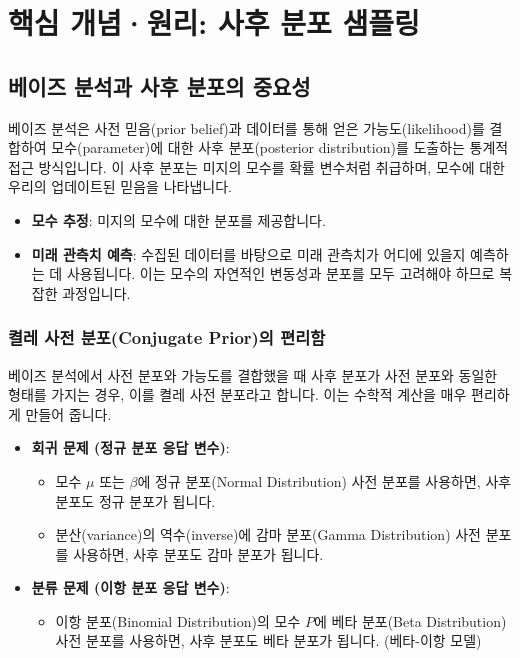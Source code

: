\documentclass[11pt,a4paper]{book}
\providecommand{\newsection}{\section}
\theoremstyle{definition}
\begin{document}
\newsection{핵심 개념·원리: 사후 분포 샘플링}

\subsection*{베이즈 분석과 사후 분포의 중요성}
베이즈 분석은 사전 믿음(prior belief)과 데이터를 통해 얻은 가능도(likelihood)를 결합하여 모수(parameter)에 대한 사후 분포(posterior distribution)를 도출하는 통계적 접근 방식입니다. 이 사후 분포는 미지의 모수를 확률 변수처럼 취급하며, 모수에 대한 우리의 업데이트된 믿음을 나타냅니다.

\begin{infobox}[title=사후 분포의 활용]
\begin{itemize}
    \item \textbf{모수 추정}: 미지의 모수에 대한 분포를 제공합니다.
    \item \textbf{미래 관측치 예측}: 수집된 데이터를 바탕으로 미래 관측치가 어디에 있을지 예측하는 데 사용됩니다. 이는 모수의 자연적인 변동성과 분포를 모두 고려해야 하므로 복잡한 과정입니다.
\end{itemize}
\end{infobox}

\subsubsection*{켤레 사전 분포(Conjugate Prior)의 편리함}
베이즈 분석에서 사전 분포와 가능도를 결합했을 때 사후 분포가 사전 분포와 동일한 형태를 가지는 경우, 이를 켤레 사전 분포라고 합니다. 이는 수학적 계산을 매우 편리하게 만들어 줍니다.

\begin{examplebox}[title=켤레 사전 분포의 예시]
\begin{itemize}
    \item \textbf{회귀 문제 (정규 분포 응답 변수)}:
    \begin{itemize}
        \item 모수 $\mu$ 또는 $\beta$에 정규 분포(Normal Distribution) 사전 분포를 사용하면, 사후 분포도 정규 분포가 됩니다.
        \item 분산(variance)의 역수(inverse)에 감마 분포(Gamma Distribution) 사전 분포를 사용하면, 사후 분포도 감마 분포가 됩니다.
    \end{itemize}
    \item \textbf{분류 문제 (이항 분포 응답 변수)}:
    \begin{itemize}
        \item 이항 분포(Binomial Distribution)의 모수 $P$에 베타 분포(Beta Distribution) 사전 분포를 사용하면, 사후 분포도 베타 분포가 됩니다. (베타-이항 모델)
    \end{itemize}
\end{itemize}
\end{examplebox}
\end{document}
